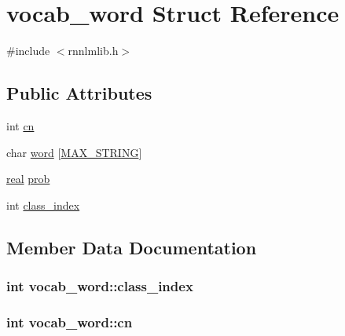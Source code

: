 \hypertarget{structvocab__word}{}\section{vocab\+\_\+word Struct Reference}
\label{structvocab__word}


{\ttfamily \#include $<$rnnlmlib.\+h$>$}

\subsection*{Public Attributes}
\begin{DoxyCompactItemize}
\item 
int \hyperlink{structvocab__word_a6bdb56ef658d1e2170b054670059cbb2}{cn}
\item 
char \hyperlink{structvocab__word_a069f94e6305a100329ca7db0c4cc6ecf}{word} \mbox{[}\hyperlink{rnnlmlib_8h_ab5187269936538ffb8ccbbe7115ffdbc}{M\+A\+X\+\_\+\+S\+T\+R\+I\+NG}\mbox{]}
\item 
\hyperlink{rnnlmlib_8h_a11d147c64891830c9e79b3315b1b2e21}{real} \hyperlink{structvocab__word_a3bb8f4f7daa1a334b44f3035cc927483}{prob}
\item 
int \hyperlink{structvocab__word_a8ce42b75c891143ce277e22bffea799c}{class\+\_\+index}
\end{DoxyCompactItemize}


\subsection{Member Data Documentation}
\subsubsection[{class\+\_\+index}]{\setlength{\rightskip}{0pt plus 5cm}int vocab\+\_\+word\+::class\+\_\+index}\hypertarget{structvocab__word_a8ce42b75c891143ce277e22bffea799c}{}\label{structvocab__word_a8ce42b75c891143ce277e22bffea799c}
\subsubsection[{cn}]{\setlength{\rightskip}{0pt plus 5cm}int vocab\+\_\+word\+::cn}\hypertarget{structvocab__word_a6bdb56ef658d1e2170b054670059cbb2}{}\label{structvocab__word_a6bdb56ef658d1e2170b054670059cbb2}
